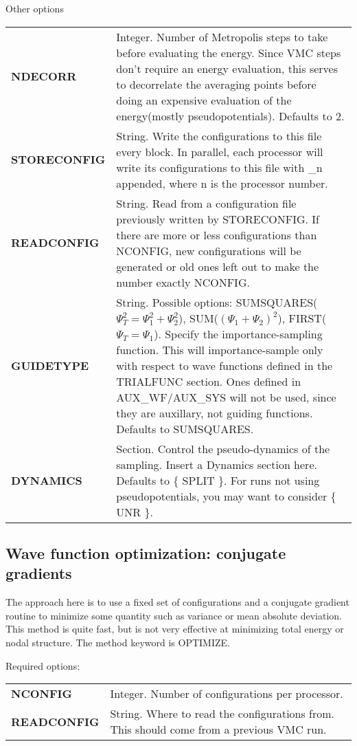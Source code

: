 \documentclass[12pt]{article}
\begin{document}
Other options \\
\begin{tabular}{lp{12cm}}
{\bf NDECORR} &   Integer.
       Number of Metropolis steps to take before evaluating the energy.
           Since VMC steps don't require an energy evaluation, this serves
           to decorrelate the averaging points before doing an expensive
           evaluation of the energy(mostly pseudopotentials). Defaults to 2.\\
{\bf STORECONFIG} & String.  Write the configurations to 
this file every block.  In parallel, each processor will write its configurations to this file with \_n appended, where n is the processor number. \\
{\bf READCONFIG } & String.  Read from a configuration file
previously written by STORECONFIG.  If there are more or less configurations 
than NCONFIG, new configurations will be generated or old ones left out to
make the number exactly NCONFIG. \\
{\bf GUIDETYPE} &  String.
     Possible options: SUMSQUARES($ \Psi_T^2 = \Psi_1^2+\Psi_2^2 $), 
      SUM($ (\Psi_1 + \Psi_2)^2 $), FIRST($ \Psi_T = \Psi_1 $). Specify
the importance-sampling function. This will importance-sample only
with respect to wave functions defined in the TRIALFUNC section.  Ones
defined in AUX\_WF/AUX\_SYS will not be used, since they are auxillary, not
guiding functions. Defaults to SUMSQUARES.\\
{\bf DYNAMICS} &  Section.
      Control the pseudo-dynamics of the sampling.  Insert a 
          Dynamics section here. Defaults to \{ SPLIT \}.  For runs not 
using pseudopotentials, you may want to consider \{ UNR \}. \\
\end{tabular}

\newpage
\subsection{Wave function optimization: conjugate gradients}
The approach here is to use a fixed set of configurations and 
a conjugate gradient routine to minimize some quantity such as 
variance or mean absolute deviation.  This method is quite fast, 
but is not very effective at minimizing total energy or nodal 
structure.  The method keyword is OPTIMIZE.

Required options: \\
\begin{tabular}{lp{12cm}}
{\bf NCONFIG} &  Integer. Number of configurations per processor. \\
{\bf READCONFIG} & String. Where to read the configurations from. This 
should come from a previous VMC run.\\
\end{tabular}
\end{document}
